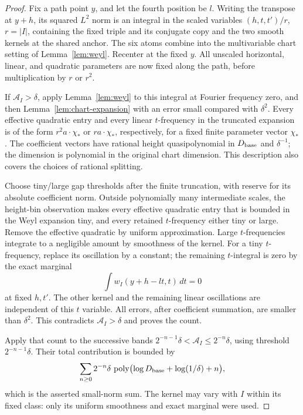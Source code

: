\begin{proof}
Fix a path point $y$, and let the fourth position
be $l$.  Writing the transpose at $y+h$, its
squared $L^2$ norm is an integral in the scaled
variables $(h,t,t')/r$, $r=|I|$, containing the
fixed triple and its conjugate copy and the two
smooth kernels at the shared anchor.  The six
atoms combine into the multivariable chart
setting of Lemma~\ref{lem:weyl}.  Recenter at
the fixed $y$.  All unscaled horizontal, linear,
and quadratic parameters are now fixed along
the path, before multiplication by $r$ or $r^2$.

If $\mathcal A_I>\delta$, apply
Lemma~\ref{lem:weyl} to this integral at Fourier
frequency zero, and then
Lemma~\ref{lem:chart-expansion} with an error
small compared with $\delta^2$.  Every effective
quadratic entry and every linear $t$-frequency
in the truncated expansion is of the form
$r^2 a\cdot\chi_*$ or $r a\cdot\chi_*$,
respectively, for a fixed finite parameter vector
$\chi_*$.  The coefficient vectors have rational
height quasipolynomial in $D_{\rm base}$ and
$\delta^{-1}$; the dimension is polynomial in
the original chart dimension.  This description
also covers the choices of rational splitting.

Choose tiny/large gap thresholds after the finite
truncation, with reserve for its absolute
coefficient norm.  Outside polynomially many
intermediate scales, the height-bin observation
makes every effective quadratic entry that is
bounded in the Weyl expansion tiny, and every
retained $t$-frequency either tiny or large.
Remove the effective quadratic by uniform
approximation.  Large $t$-frequencies integrate
to a negligible amount by smoothness of the
kernel.  For a tiny $t$-frequency, replace its
oscillation by a constant; the remaining
$t$-integral is zero by the exact marginal
\[
 \int w_I(y+h-lt,t)\,dt=0
\]
at fixed $h,t'$.  The other kernel and the
remaining linear oscillations are independent
of this $t$ variable.  All errors, after
coefficient summation, are smaller than
$\delta^2$.  This contradicts
$\mathcal A_I>\delta$ and proves the count.

Apply that count to the successive bands
$2^{-n-1}\delta<\mathcal A_I\le2^{-n}\delta$,
using threshold $2^{-n-1}\delta$.  Their total
contribution is bounded by
\[
 \sum_{n\ge0}2^{-n}\delta\,
 \operatorname{poly}\bigl(\log D_{\rm base}
                          +\log(1/\delta)+n\bigr),
\]
which is the asserted small-norm sum.  The
kernel may vary with $I$ within its fixed class:
only its uniform smoothness and exact marginal
were used.
\end{proof}

